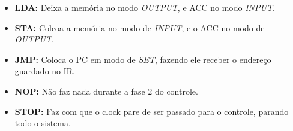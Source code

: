 \documentclass[11pt]{article}
\begin{document}
\begin{itemize}

\item \textbf{{\color{red}LDA:}} Deixa a memória no modo \emph{OUTPUT},  e ACC no modo \emph{INPUT}.

\item \textbf{\color{red}STA:} Colcoa a memória no modo de \emph{INPUT}, e o ACC no modo de \emph{OUTPUT}.

\item \textbf{\color{red}JMP:} Coloca o PC em modo de \emph{SET}, fazendo ele receber o endereço guardado no IR.

\item \textbf{\color{red}NOP:} Não faz nada durante a fase 2 do controle.

\item \textbf{\color{red}STOP:} Faz com que o clock pare de ser passado para o controle, parando todo o sistema.

\end{itemize}
\end{document}
